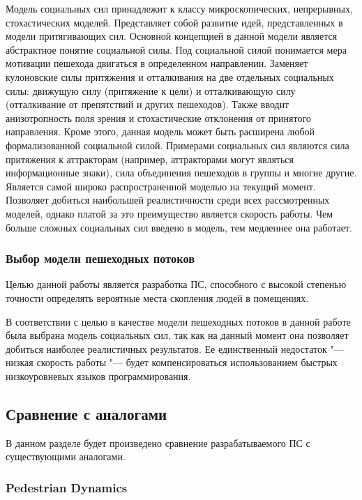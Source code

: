 Модель социальных сил принадлежит к классу микроскопических, непрерывных, стохастических моделей.
Представляет собой развитие идей, представленных в модели притягивающих сил.
Основной концепцией в данной модели является абстрактное понятие социальной силы. Под социальной силой понимается мера мотивации пешехода двигаться в определенном направлении.
Заменяет кулоновские силы притяжения и отталкивания на две отдельных социальных силы: движущую силу (притяжение к цели) и отталкивающую силу (отталкивание от препятствий и других пешеходов).
Также вводит анизотропность поля зрения и стохастические отклонения от принятого направления.
Кроме этого, данная модель может быть расширена любой формализованной социальной силой.
Примерами социальных сил являются сила притяжения к аттракторам (например, аттракторами могут являться информационные знаки), сила объединения пешеходов в группы и многие другие.
Является самой широко распространенной моделью на текущий момент.
Позволяет добиться наибольшей реалистичности среди всех рассмотренных моделей, однако платой за это преимущество является скорость работы.
Чем больше сложных социальных сил введено в модель, тем медленнее она работает.

\subsubsection{Выбор модели пешеходных потоков}
\label{sec:model:choice}

Целью данной работы является разработка ПС, способного с высокой степенью точности определять вероятные места скопления людей в помещениях.

В соответствии с целью в качестве модели пешеходных потоков в данной работе была выбрана модель социальных сил,
так как на данный момент она позволяет добиться наиболее реалистичных результатов.
Ее единственный недостаток "--- низкая скорость работы "--- будет компенсироваться использованием быстрых низкоуровневых языков программирования.

\subsection{Сравнение с аналогами}
\label{sub:domain:analogs}

В данном разделе будет произведено сравнение разрабатываемого ПС с существующими аналогами.

\subsubsection{Pedestrian Dynamics}
\label{sub:domain:analogs:pd}

